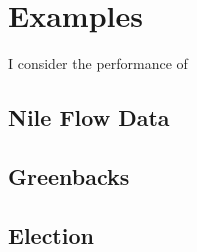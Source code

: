 \documentclass{article}
\begin{document}
\section{Examples}
\label{sec:examples}

I consider the performance of 

\subsection{Nile Flow Data}
\label{sec:nile}

\subsection{Greenbacks}
\label{sec:greenbacks-graybacks}

\subsection{Election}
\label{sec:election}
\end{document}
